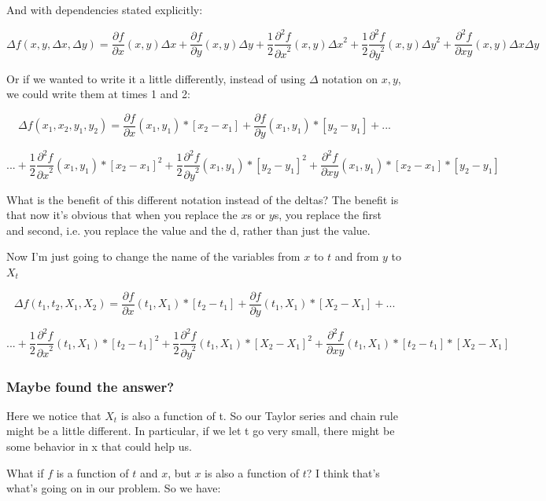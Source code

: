 \documentclass{article}
\begin{document}
And with dependencies stated explicitly:

$$\Delta f(x,y,\Delta x,\Delta y) = \frac{\partial f}{\partial x}(x,y) \Delta x + \frac{\partial f}{\partial y}(x,y) \Delta y  + \frac{1}{2}\frac{\partial^2 f}{{\partial x}^2}(x,y) {\Delta x}^2 + \frac{1}{2}\frac{\partial^2 f}{{\partial y}^2}(x,y) {\Delta y}^2 +  \frac{\partial^2 f}{\partial xy}(x,y) \Delta x\Delta y$$

Or if we wanted to write it a little differently, instead of using $\Delta$ notation on $x, y$, we could write them at times 1 and 2:

$$\Delta f(x_1,x_2,y_1,y_2) = \frac{\partial f}{\partial x}(x_1,y_1) *[x_2-x_1] + \frac{\partial f}{\partial y}(x_1,y_1) *[y_2-y_1]  + ... $$

$$... +  \frac{1}{2}\frac{\partial^2 f}{{\partial x}^2}(x_1,y_1) * {[x_2-x_1]}^2 + \frac{1}{2}\frac{\partial^2 f}{{\partial y}^2}(x_1,y_1) * {[y_2-y_1]}^2 +  \frac{\partial^2 f}{\partial xy}(x_1,y_1) *[x_2-x_1]*[y_2-y_1]$$

What is the benefit of this different notation instead of the deltas? The benefit is that now it's obvious that when you replace the $x$s or $y$s, you replace the first and second, i.e. you replace the value and the d, rather than just the value. 

Now I'm just going to change the name of the variables from $x$ to $t$ and from $y$ to $X_t$

$$\Delta f(t_1,t_2,X_1,X_2) = \frac{\partial f}{\partial x}(t_1,X_1) *[t_2-t_1] + \frac{\partial f}{\partial y}(t_1,X_1) *[X_2-X_1]  + ... $$

$$... +  \frac{1}{2}\frac{\partial^2 f}{{\partial x}^2}(t_1,X_1) * {[t_2-t_1]}^2 + \frac{1}{2}\frac{\partial^2 f}{{\partial y}^2}(t_1,X_1) * {[X_2-X_1]}^2 +  \frac{\partial^2 f}{\partial xy}(t_1,X_1) *[t_2-t_1]*[X_2-X_1]$$

\subsubsection{Maybe found the answer?}

Here we notice that $X_t$ is also a function of t. So our Taylor series and chain rule might be a little different.  In particular, if we let t go very small, there might be some behavior in x that could help us. 

What if $f$ is a function of $t$ and $x$, but $x$ is also a function of $t$? I think that's what's going on in our problem.  So we have:
\end{document}

